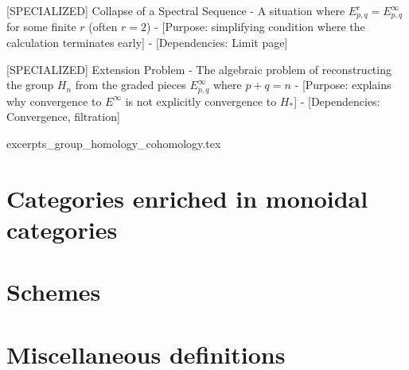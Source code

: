 {[SPECIALIZED] Collapse of a Spectral Sequence
- A situation where $E^r_{p,q} = E^\infty_{p,q}$ for some finite $r$ (often $r=2$)
- [Purpose: simplifying condition where the calculation terminates early]
- [Dependencies: Limit page]

[SPECIALIZED] Extension Problem
- The algebraic problem of reconstructing the group $H_n$ from the graded pieces $E^\infty_{p,q}$ where $p+q=n$
- [Purpose: explains why convergence to $E^\infty$ is not explicitly convergence to $H_*$]
- [Dependencies: Convergence, filtration]

}



{excerpts_group_homology_cohomology.tex}


\appendix



\section{Categories enriched in monoidal categories}

















\section{Schemes}








\section{Miscellaneous definitions}

